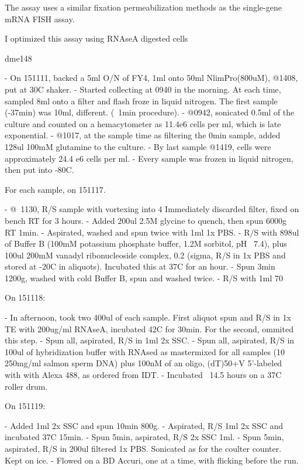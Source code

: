 The assay uses a similar fixation permeabilization methods as the
single-gene mRNA FISH assay.

I optimized this assay using RNAseA digested cells


dme148

- On 151111, backed a 5ml O/N of FY4, 1ml onto 50ml NlimPro(800uM),
  @1408, put at 30C shaker.
- Started collecting at 0940 in the morning. At each time, sampled 
  8ml onto a filter and flash froze in liquid nitrogen.
  The first sample (-37min) was 10ml, different.
  (~1min procedure).
- @0942, sonicated 0.5ml of the culture and counted on a 
  hemacytometer as 11.4e6 cells per ml, which is late exponential.
- @1017, at the sample time as filtering the 0min sample, 
  added 128ul 100mM glutamine to the culture.
- By last sample @1419, cells were approximately 24.4 e6 cells per ml.
- Every sample was frozen in liquid nitrogen, then put into -80C.

For each sample, on 151117.

- @~1130, R/S sample with vortexing into 4%
  Immediately discarded filter, fixed on bench RT for 3 hours.
- Added 200ul 2.5M glycine to quench, then spun 6000g RT 1min.
- Aspirated, washed and spun twice with 1ml 1x PBS.
- R/S with 898ul of Buffer B (100mM potassium phosphate buffer, 1.2M
  sorbitol, pH ~7.4), plus 100ul 200mM vanadyl ribonucleoside complex,
  0.2%
  (sigma, R/S in 1x PBS and stored at -20C in aliquots). 
  Incubated this at 37C for an hour. 
- Spun 3min 1200g, washed with cold Buffer B, spun and washed twice.
- R/S with 1ml 70%

On 151118:

- In afternoon, took two 400ul of each sample. First aliquot spun
  and R/S in 1x TE with 200ug/ml RNAseA, incubated 42C for 30min.
  For the second, ommited this step.
- Spun all, aspirated, R/S in 1ml 2x SSC.
- Spun all, aspirated, R/S in 100ul of hybridization buffer with
  RNAsed as mastermixed for all samples
  (10%
  250mg/ml salmon sperm DNA) plus 100nM of an oligo, (dT)50+V 
  5'-labeled with with Alexa 488, as ordered from IDT. 
- Incubated ~14.5 hours on a 37C roller drum.

On 151119:

- Added 1ml 2x SSC and spun 10min 800g. 
- Aspirated, R/S 1ml 2x SSC and incubated 37C 15min.
- Spun 5min, aspirated, R/S 2x SSC 1ml.
- Spun 5min, aspirated, R/S in 200ul filtered 1x PBS. Sonicated as for
  the coulter counter. Kept on ice.
- Flowed on a BD Accuri, one at a time, with flicking before the run.




